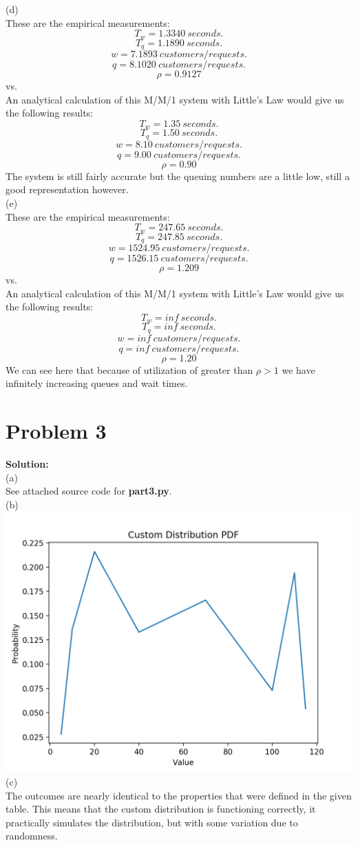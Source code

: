 \documentclass[letterpaper,11pt]{article}
\theoremstyle{mytheor}
\begin{document}
(d)\\
These are the empirical measurements:\\
$$T_w = 1.3340\ seconds.$$
$$T_q = 1.1890\ seconds.$$
$$w = 7.1893\ customers/requests.$$
$$q = 8.1020\ customers/requests.$$
$$\rho = 0.9127$$
vs.\\
An analytical calculation of this M/M/1 system with Little's Law would give us the following results:\\
$$T_w = 1.35\ seconds.$$
$$T_q = 1.50\ seconds.$$
$$w = 8.10\ customers/requests.$$
$$q = 9.00\ customers/requests.$$
$$\rho = 0.90$$
The system is still fairly accurate but the queuing numbers are a little low, still a good representation however.\\
(e)\\
These are the empirical measurements:\\
$$T_w = 247.65\ seconds.$$
$$T_q = 247.85\ seconds.$$
$$w = 1524.95\ customers/requests.$$
$$q = 1526.15\ customers/requests.$$
$$\rho = 1.209$$
vs.\\
An analytical calculation of this M/M/1 system with Little's Law would give us the following results:\\
$$T_w = inf\ seconds.$$
$$T_q = inf\ seconds.$$
$$w = inf\ customers/requests.$$
$$q = inf\ customers/requests.$$
$$\rho = 1.20$$
We can see here that because of utilization of greater than $\rho > 1$ we have infinitely increasing queues and wait times.\\

\section*{Problem 3}
\textbf{Solution:}\\
(a)\\
See attached source code for \textbf{part3.py}.\\
(b)\\
\includegraphics[scale=1]{Custom-Dist.png}\\
(c)\\ 
The outcomes are nearly identical to the properties that were defined in the given table. This means that the custom distribution is functioning correctly, it practically simulates the distribution, but with some variation due to randomness.\\
\end{document}
